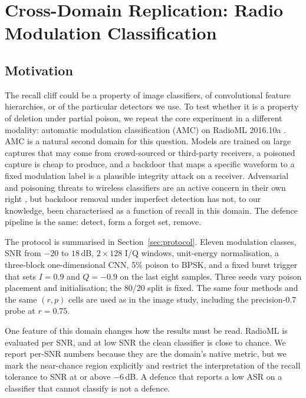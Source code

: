 \section{Cross-Domain Replication: Radio Modulation Classification}
\label{sec:rf}

\subsection{Motivation}
The recall cliff could be a property of image classifiers, of convolutional
feature hierarchies, or of the particular detectors we use. To test whether it is
a property of deletion under partial poison, we repeat the core experiment in a
different modality: automatic modulation classification (AMC) on RadioML
2016.10a \cite{radioml,radioml_jstsp}. AMC is a natural second domain for this
question. Models are trained on large captures that may come from crowd-sourced
or third-party receivers, a poisoned capture is cheap to produce, and a backdoor
that maps a specific waveform to a fixed modulation label is a plausible
integrity attack on a receiver. Adversarial and poisoning threats to wireless
classifiers are an active concern in their own right \cite{sadeghi,flowers}, but
backdoor removal under imperfect detection has not, to our knowledge, been
characterised as a function of recall in this domain. The defence pipeline is the
same: detect, form a forget set, remove.

The protocol is summarised in Section~\ref{sec:protocol}. Eleven modulation
classes, SNR from $-20$ to $18$\,dB, $2\times128$ I/Q windows, unit-energy
normalisation, a three-block one-dimensional CNN, 5\% poison to BPSK, and a fixed
burst trigger that sets $I{=}0.9$ and $Q{=}{-}0.9$ on the last eight samples.
Three seeds vary poison placement and initialisation; the 80/20 split is fixed.
The same four methods and the same $(r,p)$ cells are used as in the image study,
including the precision-0.7 probe at $r{=}0.75$.

One feature of this domain changes how the results must be read. RadioML is
evaluated per SNR, and at low SNR the clean classifier is close to chance. We
report per-SNR numbers because they are the domain's native metric, but we mark
the near-chance region explicitly and restrict the interpretation of the recall
tolerance to SNR at or above $-6$\,dB. A defence that reports a low ASR on a
classifier that cannot classify is not a defence.

